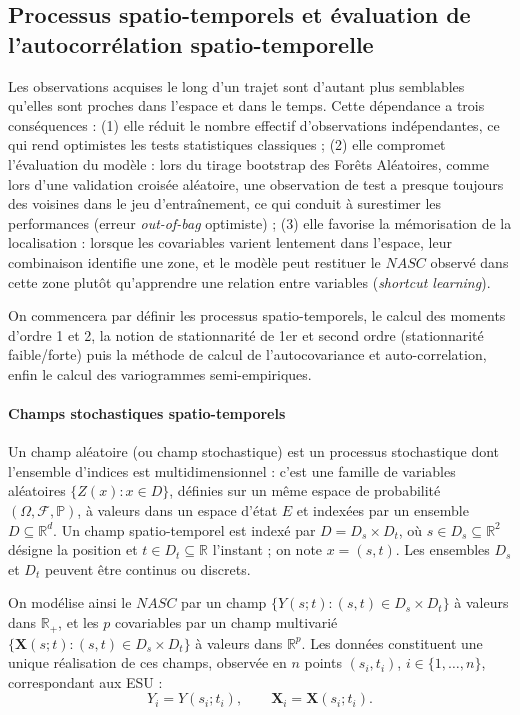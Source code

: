 	\subsection{Processus spatio-temporels et évaluation de l'autocorrélation spatio-temporelle}
		Les observations acquises le long d'un trajet sont d'autant plus semblables qu'elles sont proches dans l'espace et dans le temps. Cette dépendance a trois conséquences : (1) elle réduit le nombre effectif d'observations indépendantes, ce qui rend optimistes les tests statistiques classiques ; (2) elle compromet l'évaluation du modèle : lors du tirage bootstrap des Forêts Aléatoires, comme lors d'une validation croisée aléatoire, une observation de test a presque toujours des voisines dans le jeu d'entraînement, ce qui conduit à surestimer les performances (erreur \textit{out-of-bag} optimiste) ; (3) elle favorise la mémorisation de la localisation : lorsque les covariables varient lentement dans l'espace, leur combinaison identifie une zone, et le modèle peut restituer le $NASC$ observé dans cette zone plutôt qu'apprendre une relation entre variables (\textit{shortcut learning}).
		
		On commencera par définir les processus spatio-temporels, le calcul des moments d'ordre 1 et 2, la notion de stationnarité de 1er et second ordre (stationnarité faible/forte) puis la méthode de calcul de l'autocovariance et auto-correlation, enfin le calcul des variogrammes semi-empiriques.
		
	\paragraph{Champs stochastiques spatio-temporels}
	Un champ aléatoire (ou champ stochastique) est un processus stochastique dont l'ensemble d'indices est multidimensionnel : c'est une famille de variables aléatoires $\{Z(x) : x \in D\}$, définies sur un même espace de probabilité $(\Omega, \mathcal{F}, \mathbb{P})$, à valeurs dans un espace d'état $E$ et indexées par un ensemble $D \subseteq \mathbb{R}^d$. Un champ spatio-temporel est indexé par $D = D_s \times D_t$, où $s \in D_s \subseteq \mathbb{R}^2$ désigne la position et $t \in D_t \subseteq \mathbb{R}$ l'instant ; on note $x = (s,t)$. Les ensembles $D_s$ et $D_t$ peuvent être continus ou discrets.
	
	On modélise ainsi le $NASC$ par un champ $\{Y(s;t) : (s,t) \in D_s \times D_t\}$ à valeurs dans $\mathbb{R}_+$, et les $p$ covariables par un champ multivarié $\{\mathbf{X}(s;t) : (s,t) \in D_s \times D_t\}$ à valeurs dans $\mathbb{R}^p$. Les données constituent une unique réalisation de ces champs, observée en $n$ points $(s_i, t_i)$, $i \in \{1, \dots, n\}$, correspondant aux ESU :
	\[
	Y_i = Y(s_i; t_i), \qquad \mathbf{X}_i = \mathbf{X}(s_i; t_i).
	\]
	
